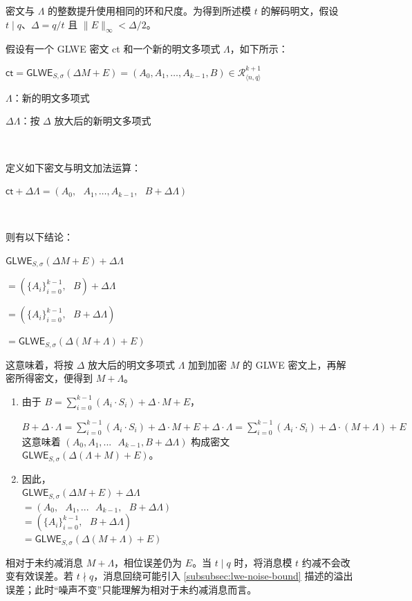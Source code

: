 密文与 $\Lambda$ 的整数提升使用相同的环和尺度。为得到所述模 $t$ 的解码明文，假设 $t\mid q$、$\Delta=q/t$ 且 $\|E\|_\infty<\Delta/2$。

假设有一个 GLWE 密文 \textsf{ct} 和一个新的明文多项式 $\Lambda$，如下所示：


$\textsf{ct} = \textsf{GLWE}_{S, \sigma}(\Delta M + E) = ( A_0, A_1, \ldots, A_{k-1}, B) \in \mathcal{R}_{\langle n,q \rangle}^{k + 1}$

$\Lambda$：新的明文多项式

$\Delta \Lambda$：按 $\Delta$ 放大后的新明文多项式

$ $

\noindent 定义如下密文与明文加法运算：

$\textsf{ct} + \Delta\Lambda = ( A_0, \text{ } A_1, \ldots, A_{k-1}, \text{ } B + \Delta \Lambda)$

$ $

\noindent 则有以下结论：

\begin{tcolorbox}[title={\textbf{\tboxlabel{\ref*{sec:glwe-add-plain}} GLWE 密文与明文的同态加法}}]
$\textsf{GLWE}_{S, \sigma}(\Delta M + E) + \Delta\Lambda $

$=  (\{A_i\}_{i=0}^{k-1}, \text{ } B) + \Delta\Lambda$

$=  (\{A_i\}_{i=0}^{k-1}, \text{ } B + \Delta\Lambda)$

$= \textsf{GLWE}_{S, \sigma}(\Delta (M + \Lambda) + E)$
\end{tcolorbox}


这意味着，将按 $\Delta$ 放大后的明文多项式 $\Lambda$ 加到加密 $M$ 的 GLWE 密文上，再解密所得密文，便得到 $M + \Lambda$。




\begin{myproof}

\begin{enumerate}
\item 由于 $B = \sum\limits_{i=0}^{k-1}{(A_i \cdot S_i)} + \Delta \cdot M + E$，

$B + \Delta \cdot \Lambda = \sum\limits_{i=0}^{k-1}{(A_i \cdot S_i)} + \Delta \cdot M + E + \Delta \cdot \Lambda = \sum\limits_{i=0}^{k-1}{(A_i \cdot S_i)} + \Delta \cdot (M + \Lambda) + E$  \\

这意味着 $(A_0, A_1, ... \text{ } A_{k-1}
, B + \Delta \Lambda)$ 构成密文 $\textsf{GLWE}_{S, \sigma}(\Delta (\Lambda + M) + E)$。
\item 因此， \\
$\textsf{GLWE}_{S, \sigma}(\Delta M + E) + \Delta\Lambda$ \\
$ = (A_0, \text { } A_1, ... \text{ } A_{k-1}, \text { } B + \Delta \Lambda)$ \\
$ = (\{A_i\}_{i=0}^{k-1}, \text { } B + \Delta \Lambda)$ \\
$= \textsf{GLWE}_{S, \sigma}(\Delta (M + \Lambda) + E)$

\end{enumerate}

\end{myproof}


相对于未约减消息 $M+\Lambda$，相位误差仍为 $E$。当 $t\mid q$ 时，将消息模 $t$ 约减不会改变有效误差。若 $t\nmid q$，消息回绕可能引入 \autoref{subsubsec:lwe-noise-bound} 描述的溢出误差；此时“噪声不变”只能理解为相对于未约减消息而言。